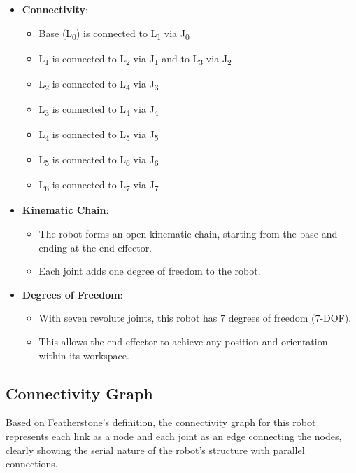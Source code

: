 \begin{solution}
\begin{itemize}
    \item \textbf{Connectivity}:
    \begin{itemize}
        \item Base (L\textsubscript{0}) is connected to L\textsubscript{1} via J\textsubscript{0}
        \item L\textsubscript{1} is connected to L\textsubscript{2} via J\textsubscript{1} and to L\textsubscript{3} via J\textsubscript{2}
        \item L\textsubscript{2} is connected to L\textsubscript{4} via J\textsubscript{3}
        \item L\textsubscript{3} is connected to L\textsubscript{4} via J\textsubscript{4}
        \item L\textsubscript{4} is connected to L\textsubscript{5} via J\textsubscript{5}
        \item L\textsubscript{5} is connected to L\textsubscript{6} via J\textsubscript{6}
        \item L\textsubscript{6} is connected to L\textsubscript{7} via J\textsubscript{7}
    \end{itemize}
    
    \item \textbf{Kinematic Chain}:
    \begin{itemize}
        \item The robot forms an open kinematic chain, starting from the base and ending at the end-effector.
        \item Each joint adds one degree of freedom to the robot.
    \end{itemize}
    
    \item \textbf{Degrees of Freedom}:
    \begin{itemize}
        \item With seven revolute joints, this robot has 7 degrees of freedom (7-DOF).
        \item This allows the end-effector to achieve any position and orientation within its workspace.
    \end{itemize}
\end{itemize}

 \subsection*{Connectivity Graph}

Based on Featherstone's \cite{featherstone2014rigid} definition, the connectivity graph for this robot represents each link as a node and each joint as an edge connecting the nodes, clearly showing the serial nature of the robot's structure with parallel connections.


\end{solution}
